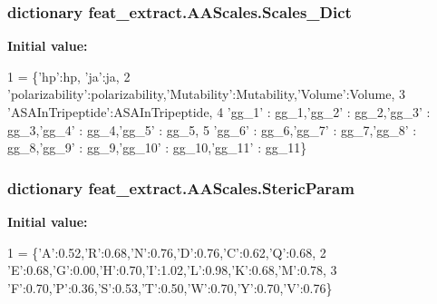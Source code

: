 \subsubsection[{Scales\+\_\+\+Dict}]{\setlength{\rightskip}{0pt plus 5cm}dictionary feat\+\_\+extract.\+A\+A\+Scales.\+Scales\+\_\+\+Dict}\label{namespacefeat__extract_1_1_a_a_scales_aab8e344910bd82fbce1a3a951aaecc39}
{\bfseries Initial value\+:}
\begin{DoxyCode}
1 = \{\textcolor{stringliteral}{'hp'}:hp, \textcolor{stringliteral}{'ja'}:ja,
2 \textcolor{stringliteral}{'polarizability'}:polarizability,\textcolor{stringliteral}{'Mutability'}:Mutability,\textcolor{stringliteral}{'Volume'}:Volume,
3 \textcolor{stringliteral}{'ASAInTripeptide'}:ASAInTripeptide,
4         \textcolor{stringliteral}{'gg\_1'} : gg\_1,\textcolor{stringliteral}{'gg\_2'} : gg\_2,\textcolor{stringliteral}{'gg\_3'} : gg\_3,\textcolor{stringliteral}{'gg\_4'} : gg\_4,\textcolor{stringliteral}{'gg\_5'} : gg\_5,
5 \textcolor{stringliteral}{'gg\_6'} : gg\_6,\textcolor{stringliteral}{'gg\_7'} : gg\_7,\textcolor{stringliteral}{'gg\_8'} : gg\_8,\textcolor{stringliteral}{'gg\_9'} : gg\_9,\textcolor{stringliteral}{'gg\_10'} : gg\_10,\textcolor{stringliteral}{'gg\_11'} : gg\_11\}
\end{DoxyCode}
\hypertarget{namespacefeat__extract_1_1_a_a_scales_aa7281dcef2cd9e79a5c69ef41d9c0776}{}
\subsubsection[{Steric\+Param}]{\setlength{\rightskip}{0pt plus 5cm}dictionary feat\+\_\+extract.\+A\+A\+Scales.\+Steric\+Param}\label{namespacefeat__extract_1_1_a_a_scales_aa7281dcef2cd9e79a5c69ef41d9c0776}
{\bfseries Initial value\+:}
\begin{DoxyCode}
1 = \{\textcolor{stringliteral}{'A'}:0.52,\textcolor{stringliteral}{'}\textcolor{stringliteral}{R':0.68,'}N':0.76,'D':0.76,'C':0.62,'Q':0.68,
2                                          \textcolor{stringliteral}{'E'}:0.68,\textcolor{stringliteral}{'G'}:0.00,\textcolor{stringliteral}{'H'}:0.70,\textcolor{stringliteral}{'I'}:1.02,\textcolor{stringliteral}{'L'}:0.98,\textcolor{stringliteral}{'K'}:0.68,\textcolor{stringliteral}{'M'}:0.78,
3                                           \textcolor{stringliteral}{'F'}:0.70,\textcolor{stringliteral}{'P'}:0.36,\textcolor{stringliteral}{'S'}:0.53,\textcolor{stringliteral}{'T'}:0.50,\textcolor{stringliteral}{'W'}:0.70,\textcolor{stringliteral}{'Y'}:0.70,\textcolor{stringliteral}{'V'}:0.76\}
\end{DoxyCode}
\hypertarget{namespacefeat__extract_1_1_a_a_scales_a10480e9775cdaee458b50fa51a5bd829}{}
